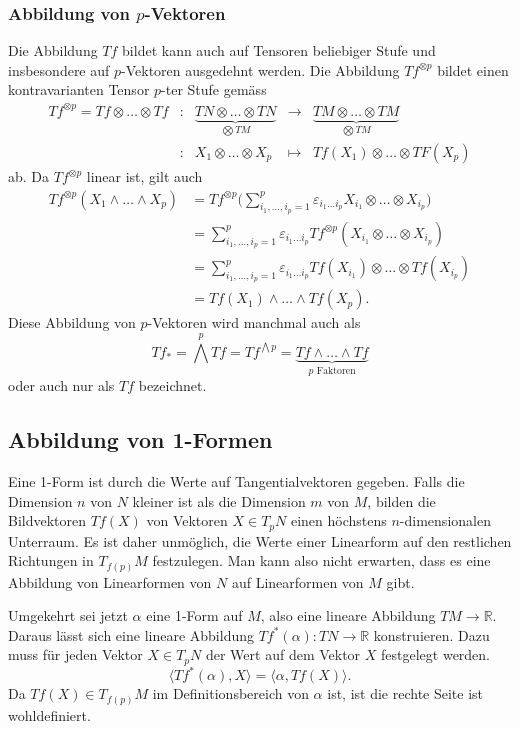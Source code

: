 \subsubsection{Abbildung von $p$-Vektoren}
Die Abbildung $Tf$ bildet kann auch auf Tensoren beliebiger Stufe und
insbesondere auf $p$-Vektoren ausgedehnt werden.
Die Abbildung $Tf^{\otimes p}$ bildet einen kontravarianten Tensor
$p$-ter Stufe gemäss
\[
\renewcommand{\arraycolsep}{1.5pt}
\begin{array}{rcccc}
Tf^{\otimes p}
=
Tf\otimes\dots\otimes Tf
&:&
\underbrace{TN\otimes\dots\otimes TN}_{\bigotimes TM}
&\to&
\underbrace{TM\otimes\dots\otimes TM}_{\bigotimes TM}
\\
&:&
X_1\otimes\dots\otimes X_p
&\mapsto&
Tf(X_1)\otimes\dots\otimes TF(X_p)
\end{array}
\]
ab.
Da $Tf^{\otimes p}$ linear ist, gilt auch
\begin{align*}
Tf^{\otimes p}(X_1\wedge\dots\wedge X_p)
&=
Tf^{\otimes p}\biggl(
\sum_{i_1,\dots,i_p=1}^{p}
\varepsilon_{i_1\dots i_p}
X_{i_1} \otimes\dots\otimes X_{i_p}
\biggr)
\\
&=
\sum_{i_1,\dots,i_p=1}^{p}
\varepsilon_{i_1\dots i_p}
Tf^{\otimes p}(X_{i_1}\otimes\dots\otimes X_{i_p})
\\
&=
\sum_{i_1,\dots,i_p=1}^{p}
\varepsilon_{i_1\dots i_p}
Tf(X_{i_1})\otimes\dots\otimes Tf(X_{i_p})
\\
&=
Tf(X_1)\wedge\dots\wedge Tf(X_p).
\end{align*}
Diese Abbildung  von $p$-Vektoren wird manchmal auch als
\[
Tf_*
=
{\textstyle\bigwedge^p}Tf
=
Tf^{\bigwedge p}
=
\underbrace{Tf\wedge\dots\wedge Tf}_{\displaystyle \text{$p$ Faktoren}}
\]
oder auch nur als $Tf$ bezeichnet.

%
%
\subsection{Abbildung von 1-Formen}
Eine 1-Form ist durch die Werte auf Tangentialvektoren
gegeben.
Falls die Dimension $n$ von $N$ kleiner ist als die Dimension $m$ von $M$,
bilden die Bildvektoren $Tf(X)$ von Vektoren $X\in T_pN$ einen höchstens
$n$-dimensionalen Unterraum.
Es ist daher unmöglich, die Werte einer Linearform auf den restlichen
Richtungen in $T_{f(p)}M$ festzulegen.
Man kann also nicht erwarten, dass es eine Abbildung von Linearformen
von $N$ auf Linearformen von $M$ gibt.

Umgekehrt sei jetzt $\alpha$ eine 1-Form auf $M$, also eine lineare
Abbildung $TM\to \mathbb{R}$.
Daraus lässt sich eine lineare Abbildung
$Tf^*(\alpha)\colon TN\to\mathbb{R}$ konstruieren.
Dazu muss für jeden Vektor $X\in T_pN$ der Wert auf dem Vektor $X$
festgelegt werden.
\[
\langle Tf^*(\alpha),X\rangle
=
\langle \alpha, Tf(X)\rangle.
\]
Da $Tf(X)\in T_{f(p)}M$ im Definitionsbereich von $\alpha$ ist, ist
die rechte Seite ist wohldefiniert.

